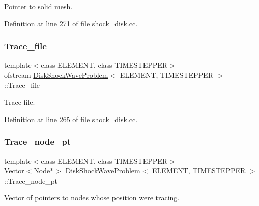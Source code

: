 Pointer to solid mesh. 



Definition at line 271 of file shock\+\_\+disk.\+cc.

\mbox{\label{classDiskShockWaveProblem_a8ec35b07dc6870e4d5b729288053c4fe}} 
\subsubsection{\texorpdfstring{Trace\+\_\+file}{Trace\_file}}
{\footnotesize\ttfamily template$<$class E\+L\+E\+M\+E\+NT, class T\+I\+M\+E\+S\+T\+E\+P\+P\+ER$>$ \\
ofstream \hyperlink{classDiskShockWaveProblem}{Disk\+Shock\+Wave\+Problem}$<$ E\+L\+E\+M\+E\+NT, T\+I\+M\+E\+S\+T\+E\+P\+P\+ER $>$\+::Trace\+\_\+file\hspace{0.3cm}{\ttfamily [private]}}



Trace file. 



Definition at line 265 of file shock\+\_\+disk.\+cc.

\mbox{\label{classDiskShockWaveProblem_a7ab6db65bbf28185b238e84bbc16c1b8}} 
\subsubsection{\texorpdfstring{Trace\+\_\+node\+\_\+pt}{Trace\_node\_pt}}
{\footnotesize\ttfamily template$<$class E\+L\+E\+M\+E\+NT, class T\+I\+M\+E\+S\+T\+E\+P\+P\+ER$>$ \\
Vector$<$Node$\ast$$>$ \hyperlink{classDiskShockWaveProblem}{Disk\+Shock\+Wave\+Problem}$<$ E\+L\+E\+M\+E\+NT, T\+I\+M\+E\+S\+T\+E\+P\+P\+ER $>$\+::Trace\+\_\+node\+\_\+pt\hspace{0.3cm}{\ttfamily [private]}}



Vector of pointers to nodes whose position we\textquotesingle{}re tracing. 




